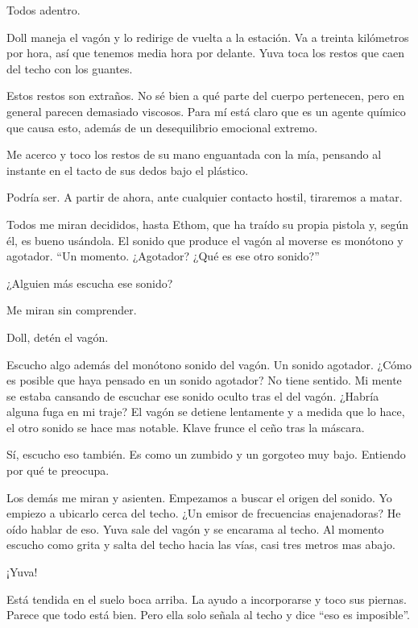 \reply Todos adentro.

Doll maneja el vagón y lo redirige de vuelta a la estación. Va a treinta kilómetros por hora, así que tenemos media hora por delante. Yuva toca los restos que caen del techo con los guantes.

\reply Estos restos son extraños. No sé bien a qué parte del cuerpo pertenecen, pero en general parecen demasiado viscosos. Para mí está claro que es un agente químico que causa esto, además de un desequilibrio emocional extremo.

Me acerco y toco los restos de su mano enguantada con la mía, pensando al instante en el tacto de sus dedos bajo el plástico.

\reply Podría ser. A partir de ahora, ante cualquier contacto hostil, tiraremos a matar.

Todos me miran decididos, hasta Ethom, que ha traído su propia pistola y, según él, es bueno usándola. El sonido que produce el vagón al moverse es monótono y agotador. ``Un momento. ¿Agotador? ¿Qué es ese otro sonido?''

\reply ¿Alguien más escucha ese sonido?

Me miran sin comprender.

\reply Doll, detén el vagón.

Escucho algo además del monótono sonido del vagón. Un sonido agotador. ¿Cómo es posible que haya pensado en un sonido agotador? No tiene sentido. Mi mente se estaba cansando de escuchar ese sonido oculto tras el del vagón. ¿Habría alguna fuga en mi traje? El vagón se detiene lentamente y a medida que lo hace, el otro sonido se hace mas notable. Klave frunce el ceño tras la máscara.

\reply Sí, escucho eso también. Es como un zumbido y un gorgoteo muy bajo. Entiendo por qué te preocupa.

Los demás me miran y asienten. Empezamos a buscar el origen del sonido. Yo empiezo a ubicarlo cerca del techo. ¿Un emisor de frecuencias enajenadoras? He oído hablar de eso. Yuva sale del vagón y se encarama al techo. Al momento escucho como grita y salta del techo hacia las vías, casi tres metros mas abajo.

\reply ¡Yuva!

Está tendida en el suelo boca arriba. La ayudo a incorporarse y toco sus piernas. Parece que todo está bien. Pero ella solo señala al techo y dice ``eso es imposible''. 

